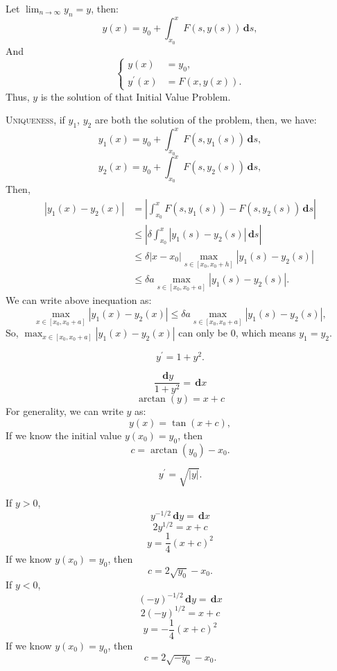 \documentclass[en, normal, 11pt, black]{elegantnote}
\newenvironment{exercise}[1]{\begin{tcolorbox}[colback=black!15, colframe=black!80, breakable, title=#1]}{\end{tcolorbox}}
\renewenvironment{proof}{\begin{tcolorbox}[colback=white, colframe=black!50, breakable, title=Proof. ]\setlength{\parskip}{0.8em}}{\,\\\rightline{$\square$}\end{tcolorbox}}
\newenvironment{solution}{\begin{tcolorbox}[colback=white, colframe=black!50, breakable, title=Solution. ]\setlength{\parskip}{0.8em}}{\end{tcolorbox}}
\newcommand{\der}{\,\mathbf{d}}
\begin{document}
\begin{proof}
        Let $\lim_{n\to\infty}y_n=y$, then: 
        \[y(x)=y_0+\int_{x_0}^xF(s,y(s))\der s, \]
        And 
        \begin{equation*}
            \left\{
                \begin{aligned}
                    y(x)&=y_0, \\
                    y^\prime(x)&=F(x, y(x)). 
                \end{aligned}
            \right.
        \end{equation*}
        Thus, $y$ is the solution of that Initial Value Problem. 
    \end{proof}
    \begin{proof}
        \textsc{Uniqueness}, if $y_1$, $y_2$ are both the solution of the problem, then, we have: 
        \[y_1(x)=y_0+\int_{x_0}^xF(s,y_1(s))\der s, \]
        \[y_2(x)=y_0+\int_{x_0}^xF(s,y_2(s))\der s, \]
        Then, 
        \begin{align*}
            |y_1(x)-y_2(x)|&=\left|\int_{x_0}^xF(s,y_1(s))-F(s,y_2(s))\der s\right|\\
            &\leqslant\left|\delta\int_{x_0}^x|y_1(s)-y_2(s)|\der s\right|\\
            &\leqslant\delta |x-x_0| \max_{s\in [x_0,x_0+h]}|y_1(s)-y_2(s)|\\
            &\leqslant \delta a \max_{s\in [x_0,x_0+a]}|y_1(s)-y_2(s)|. 
        \end{align*}
        We can write above inequation as: 
        \[\max_{x\in [x_0, x_0+a]}|y_1(x)-y_2(x)|\leqslant \delta a \max_{s\in [x_0,x_0+a]}|y_1(s)-y_2(s)|, \]
        So, $\max_{x\in [x_0, x_0+a]}|y_1(x)-y_2(x)|$ can only be $0$, which means $y_1=y_2$. 
    \end{proof}
    \begin{exercise}{\textsc{Exercise. }1}
        \[y^\prime=1+y^2.\]
    \end{exercise}
    \begin{solution}
        \[\frac{\der y}{1+y^2}=\der x\]
        \[\arctan(y)=x+c\]
        For generality, we can write $y$ as: 
        \[y(x)=\tan(x+c), \]
        If we know the initial value $y(x_0)=y_0$, then
        \[c=\arctan(y_0)-x_0. \]
    \end{solution}
    \begin{exercise}{\textsc{Exercise. }2}
        \[y^\prime=\sqrt{|y|}. \]
    \end{exercise}
    \begin{solution}
        If $y>0$, 
        \[y^{-1/2}\der y=\der x\]
        \[2y^{1/2}=x+c\]
        \[y=\frac{1}{4}(x+c)^2\]
        If we know $y(x_0)=y_0$, then
        \[c=2\sqrt{y_0}-x_0. \]
        If $y<0$, 
        \[(-y)^{-1/2}\der y=\der x\]
        \[2(-y)^{1/2}=x+c\]
        \[y=-\frac{1}{4}(x+c)^2\]
        If we know $y(x_0)=y_0$, then
        \[c=2\sqrt{-y_0}-x_0. \]
    \end{solution}
\end{document}
